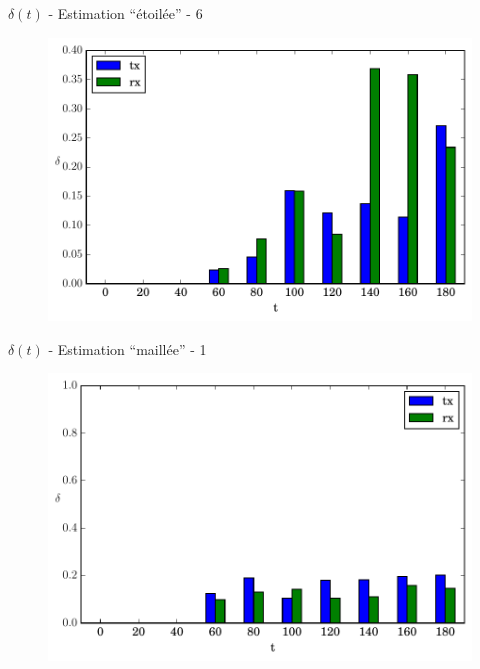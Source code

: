 \begin{frame}{$\delta(t)$ - Estimation ``étoilée'' - 6}
  \begin{figure}
    \centering  
    \includegraphics[width=\textwidth]{figures/evolution_noinfo_6.pdf}
  \end{figure}
\end{frame}


\begin{frame}{$\delta(t)$ - Estimation ``maillée'' - 1}
  \begin{figure}
    \centering  
    \includegraphics[width=\textwidth]{figures/evolution_route_1.pdf}
  \end{figure}
\end{frame}

